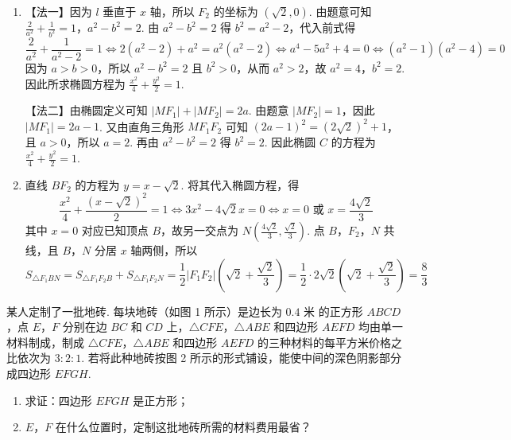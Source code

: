 \begin{solution}
\begin{enumerate}
\item 【法一】因为 \(l\) 垂直于 \(x\) 轴，所以 \(F_2\) 的坐标为 \((\sqrt{2},0)\). 由题意可知 \(\frac{2}{a^2}+\frac{1}{b^2}=1\)，\(a^2-b^2=2\).
由 \(a^2-b^2=2\) 得 \(b^2=a^2-2\)，代入前式得
\[
\frac{2}{a^2}+\frac{1}{a^2-2}=1
\Longleftrightarrow 2\left(a^2-2\right)+a^2=a^2\left(a^2-2\right)
\Longleftrightarrow a^4-5a^2+4=0
\Longleftrightarrow \left(a^2-1\right)\left(a^2-4\right)=0
\]
因为 \(a>b>0\)，所以 \(a^2-b^2=2\) 且 \(b^2>0\)，从而 \(a^2>2\)，故 \(a^2=4\)，\(b^2=2\). 因此所求椭圆方程为 \(\frac{x^2}{4}+\frac{y^2}{2}=1\).

【法二】由椭圆定义可知 \(|MF_1|+|MF_2|=2a\). 由题意 \(|MF_2|=1\)，因此 \(|MF_1|=2a-1\). 又由直角三角形 \(MF_1F_2\) 可知 \((2a-1)^2=(2\sqrt{2})^2+1\)，且 \(a>0\)，所以 \(a=2\). 再由 \(a^2-b^2=2\) 得 \(b^2=2\). 因此椭圆 \(C\) 的方程为 \(\frac{x^2}{4}+\frac{y^2}{2}=1\).

\item 直线 \(BF_2\) 的方程为 \(y=x-\sqrt{2}\). 将其代入椭圆方程，得
\[
\frac{x^2}{4}+\frac{(x-\sqrt{2})^2}{2}=1
\Longleftrightarrow 3x^2-4\sqrt{2}x=0
\Longleftrightarrow x=0\text{ 或 }x=\frac{4\sqrt{2}}{3}
\]
其中 \(x=0\) 对应已知顶点 \(B\)，故另一交点为 \(N\left(\frac{4\sqrt{2}}{3},\frac{\sqrt{2}}{3}\right)\). 点 \(B\)，\(F_2\)，\(N\) 共线，且 \(B\)，\(N\) 分居 \(x\) 轴两侧，所以
\[
S_{\triangle F_1BN}=S_{\triangle F_1F_2B}+S_{\triangle F_1F_2N}
=\frac{1}{2}|F_1F_2|\left(\sqrt{2}+\frac{\sqrt{2}}{3}\right)
=\frac{1}{2}\cdot2\sqrt{2}\left(\sqrt{2}+\frac{\sqrt{2}}{3}\right)=\frac{8}{3}
\]
\end{enumerate}
\end{solution}

\begin{problem}
某人定制了一批地砖. 每块地砖（如图 1 所示）是边长为 \(0.4\text{ 米}\) 的正方形 \(ABCD\)，点 \(E\)，\(F\) 分别在边 \(BC\) 和 \(CD\) 上，\(\triangle CFE\)，\(\triangle ABE\) 和四边形 \(AEFD\) 均由单一材料制成，制成 \(\triangle CFE\)，\(\triangle ABE\) 和四边形 \(AEFD\) 的三种材料的每平方米价格之比依次为 \(3:2:1\). 若将此种地砖按图 2 所示的形式铺设，能使中间的深色阴影部分成四边形 \(EFGH\).

\begin{enumerate}
\item 求证：四边形 \(EFGH\) 是正方形；
\item \(E\)，\(F\) 在什么位置时，定制这批地砖所需的材料费用最省？
\end{enumerate}

\end{problem}

